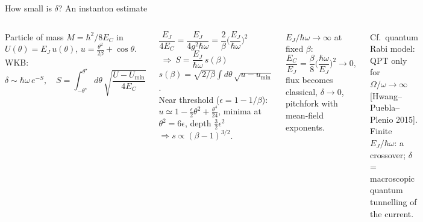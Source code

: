 \documentclass[aspectratio=169,9pt]{beamer}
\newcommand{\hw}{\hbar\omega}
\renewcommand{\cite}[1]{{\scriptsize\textcolor{ink!60}{[#1]}}}
\begin{document}
\begin{frame}{How small is $\delta$? An instanton estimate}
  \begin{columns}[T]
    Particle of mass $M=\hbar^2/8E_C$ in $U(\theta)=E_J\,u(\theta)$,
    $u=\frac{\theta^2}{2\beta}+\cos\theta$. WKB:
    \[
      \delta\sim\hw\,e^{-S},\quad
      S=\int_{-\theta^\star}^{\theta^\star}\!d\theta\,\sqrt{\frac{U-U_{\min}}{4E_C}}
    \]
    \begin{calcbox}[title={Scaling}]
      \small $\dfrac{E_J}{4E_C}=\dfrac{E_J}{4g^2\hw}=\dfrac{2}{\beta}\Big(\dfrac{E_J}{\hw}\Big)^2$
      $\ \Rightarrow\ \boxed{S=\dfrac{E_J}{\hw}\,s(\beta)}$\\[1mm]
      $s(\beta)=\sqrt{2/\beta}\int\!d\theta\,\sqrt{u-u_{\min}}$.\\
      Near threshold ($\epsilon=1-1/\beta$): $u\simeq1-\frac{\epsilon}{2}\theta^2+\frac{\theta^4}{24}$,
      minima at $\theta^2=6\epsilon$, depth $\frac32\epsilon^2$ $\Rightarrow s\propto(\beta-1)^{3/2}$.
    \end{calcbox}
    \begin{keybox}[title={Sharp transition only in a scaling limit}]
      \small $E_J/\hw\to\infty$ at fixed $\beta$:
      \[
        \frac{E_C}{E_J}=\frac{\beta}{8}\Big(\frac{\hw}{E_J}\Big)^2\to0 ,
      \]
      flux becomes classical, $\delta\to0$, pitchfork with mean-field exponents.
    \end{keybox}
    \small Cf.\ quantum Rabi model: QPT only for $\Omega/\omega\to\infty$ \cite{Hwang--Puebla--Plenio 2015}.
    Finite $E_J/\hw$: a crossover; $\delta$ = macroscopic quantum tunnelling of the current.
  \end{columns}
\end{frame}
\end{document}

